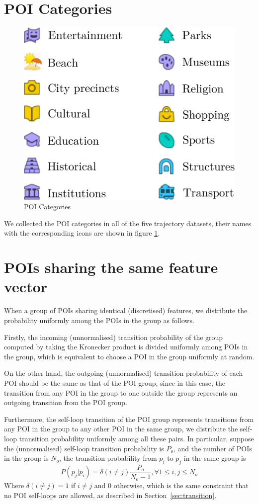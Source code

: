 \newpage

\appendix

\section{POI Categories}
\begin{figure}[t]
	\centering
	\includegraphics[width=0.6\columnwidth]{fig/poi_cats.pdf}
	\caption{POI Categories}
	\label{fig:poicats}
\end{figure}

We collected the POI categories in all of the five trajectory datasets,
their names with the corresponding icons are shown in figure \ref{fig:poicats}.


\section{POIs sharing the same feature vector}
When a group of POIs sharing identical (discretised) features,
we distribute the probability uniformly among the POIs in the group as follows.

Firstly, the incoming (unnormalised) transition probability of the group computed by taking 
the Kronecker product is divided uniformly among POIs in the group,
which is equivalent to choose a POI in the group uniformly at random.

On the other hand, the outgoing (unnormalised) transition probability of each POI 
should be the same as that of the POI group, 
since in this case, the transition from any POI in the group to one outside the group 
represents an outgoing transition from the POI group.

Furthermore, the self-loop transition of the POI group represents transitions from any POI in the group
to any other POI in the same group, we distribute the self-loop transition probability uniformly 
among all these pairs.
In particular, suppose the (unnormalised) self-loop transition probability is $P_o$,
and the number of POIs in the group is $N_o$,
the transition probability from $p_i$ to $p_j$ in the same group is
\begin{displaymath}
    P(p_j | p_i) = \delta(i \ne j) \frac{P_o}{N_o - 1}, \forall 1 \le i, j \le N_o
\end{displaymath}
Where $\delta(i \ne j) = 1$ if $i \ne j$ and $0$ otherwise, which is the same constraint that no POI
self-loops are allowed, as described in Section~\ref{sec:transition}.

